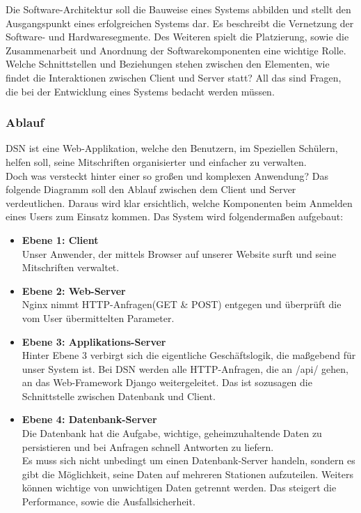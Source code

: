 
Die Software-Architektur soll die Bauweise eines Systems abbilden und stellt den Ausgangspunkt eines erfolgreichen Systems dar. Es beschreibt die Vernetzung der Software- und Hardwaresegmente. Des Weiteren spielt die Platzierung, sowie die Zusammenarbeit und Anordnung der Softwarekomponenten eine wichtige Rolle.\\
Welche Schnittstellen und Beziehungen stehen zwischen den Elementen, wie findet die Interaktionen zwischen Client und Server statt? All das sind Fragen, die bei der Entwicklung eines Systems bedacht werden müssen. \cite{VERTEILTE_SYSTEME}

\subsubsection{Ablauf}
DSN ist eine Web-Applikation, welche den Benutzern, im Speziellen Schülern, helfen soll, seine Mitschriften organisierter und einfacher zu verwalten.\\
Doch was versteckt hinter einer so großen und komplexen Anwendung? Das folgende Diagramm soll den Ablauf zwischen dem Client und Server verdeutlichen. Daraus wird klar ersichtlich, welche Komponenten beim Anmelden eines Users zum Einsatz kommen. Das System wird folgendermaßen aufgebaut:
\begin{itemize}
\item \textbf{Ebene 1: Client}\\ Unser Anwender, der mittels Browser auf unserer Website surft und seine Mitschriften verwaltet.
\item \textbf{Ebene 2: Web-Server}\\ Nginx nimmt HTTP-Anfragen(GET \& POST) entgegen und überprüft die vom User übermittelten Parameter.
\item \textbf{Ebene 3: Applikations-Server}\\ Hinter Ebene 3 verbirgt sich die eigentliche Geschäftslogik, die maßgebend für unser System ist. Bei DSN werden alle HTTP-Anfragen, die an /api/ gehen, an das Web-Framework Django weitergeleitet. Das ist sozusagen die Schnittstelle zwischen Datenbank und Client.
\newpage
\item \textbf{Ebene 4: Datenbank-Server}\\ Die Datenbank hat die Aufgabe, wichtige, geheimzuhaltende Daten zu persistieren und bei Anfragen schnell Antworten zu liefern.\\
Es muss sich nicht unbedingt um einen Datenbank-Server handeln, sondern es gibt die Möglichkeit, seine Daten auf mehreren Stationen aufzuteilen. Weiters können wichtige von unwichtigen Daten getrennt werden. Das steigert die Performance, sowie die Ausfallsicherheit.
\end{itemize}

